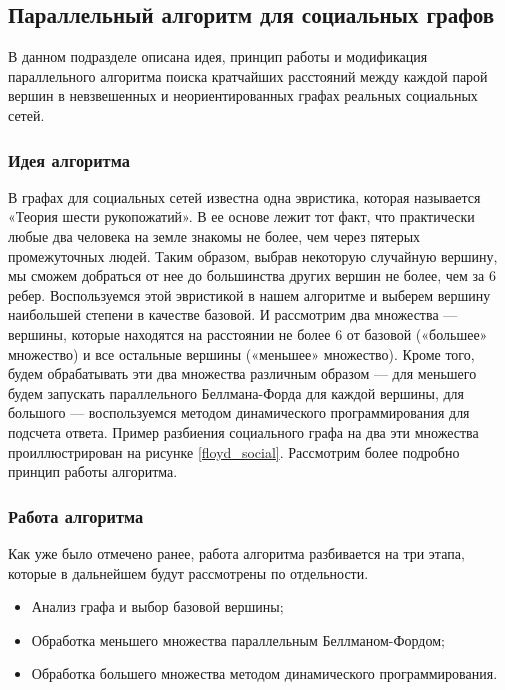 \FloatBarrier
\subsection{Параллельный алгоритм для социальных графов}
В данном подразделе описана идея, принцип работы и модификация параллельного алгоритма поиска кратчайших расстояний между каждой парой вершин в невзвешенных и неориентированных графах реальных социальных сетей.
\FloatBarrier
\subsubsection{Идея алгоритма}
В графах для социальных сетей известна одна эвристика, которая называется «Теория шести рукопожатий». В ее основе лежит тот факт, что практически любые два человека на земле знакомы не более, чем через пятерых промежуточных людей. Таким образом, выбрав некоторую случайную вершину, мы сможем добраться от нее до большинства других вершин не более, чем за 6 ребер. Воспользуемся этой эвристикой в нашем алгоритме и выберем вершину наибольшей степени в качестве базовой. И рассмотрим два множества --- вершины, которые находятся на расстоянии не более 6 от базовой («большее» множество) и все остальные вершины («меньшее» множество). Кроме того, будем обрабатывать эти два множества различным образом --- для меньшего будем запускать параллельного Беллмана-Форда для каждой вершины, для большого --- воспользуемся методом динамического программирования для подсчета ответа. Пример разбиения социального графа на два эти множества проиллюстрирован на рисунке \ref{floyd_social}. Рассмотрим более подробно принцип работы алгоритма.

\FloatBarrier
\subsubsection{Работа алгоритма}
Как уже было отмечено ранее, работа алгоритма разбивается на три этапа, которые в дальнейшем будут рассмотрены по отдельности.

\begin{itemize}
  \item Анализ графа и выбор базовой вершины; 
  \item Обработка меньшего множества параллельным Беллманом-Фордом;
  \item Обработка большего множества методом динамического программирования.
\end{itemize}



